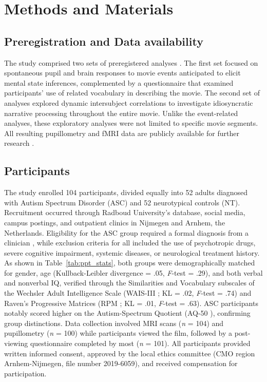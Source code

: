 \section{Methods and Materials}
\subsection{Preregistration and Data availability}
The study comprised two sets of preregistered analyses \citep{mangnus2022}. The first set focused on spontaneous pupil and brain responses to movie events anticipated to elicit mental state inferences, complemented by a questionnaire that examined participants' use of related vocabulary in describing the movie. The second set of analyses explored dynamic intersubject correlations to investigate idiosyncratic narrative processing throughout the entire movie. Unlike the event-related analyses, these exploratory analyses were not limited to specific movie segments. All resulting pupillometry and fMRI data are publicly available for further research \citep{mangnus2024dataset}.

\subsection{Participants}
The study enrolled 104 participants, divided equally into 52 adults diagnosed with Autism Spectrum Disorder (ASC) and 52 neurotypical controls (NT). Recruitment occurred through Radboud University's database, social media, campus postings, and outpatient clinics in Nijmegen and Arnhem, the Netherlands. Eligibility for the ASC group required a formal diagnosis from a clinician \citep{apa2013}, while exclusion criteria for all included the use of psychotropic drugs, severe cognitive impairment, systemic diseases, or neurological treatment history. As shown in Table~\ref{tab:ppt_stats}, both groups were demographically matched for gender, age (Kullback-Leibler divergence = .05, \textit{F}-test = .29), and both verbal and nonverbal IQ, verified through the Similarities and Vocabulary subscales of the Wechsler Adult Intelligence Scale (WAIS-III \citep{wechsler1997}; KL = .02, \textit{F}-test = .74) and Raven's Progressive Matrices (RPM \citep{raven1989}; KL = .01, \textit{F}-test = .63). ASC participants notably scored higher on the Autism-Spectrum Quotient (AQ-50 \citep{baron-cohen2001AQ}), confirming group distinctions. Data collection involved MRI scans (\textit{n} = 104) and pupillometry (\textit{n} = 100) while participants viewed the film, followed by a post-viewing questionnaire completed by most (\textit{n} = 101). All participants provided written informed consent, approved by the local ethics committee (CMO region Arnhem-Nijmegen, file number 2019-6059), and received compensation for participation.

